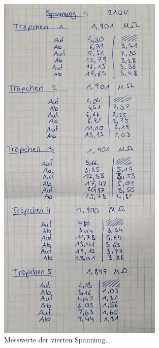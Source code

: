\begin{figure}
    \centering
    \includegraphics[width=0.7\textwidth]{bilder/Spannung4.jpg}
    \caption{Messwerte der vierten Spannung.}
\end{figure}

